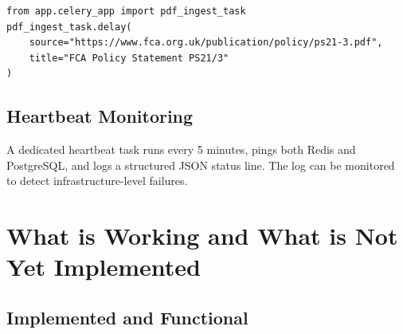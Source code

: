 \documentclass[12pt,a4paper]{article}
\begin{document}
\begin{lstlisting}[caption={Trigger a manual PDF extraction}]
from app.celery_app import pdf_ingest_task
pdf_ingest_task.delay(
    source="https://www.fca.org.uk/publication/policy/ps21-3.pdf",
    title="FCA Policy Statement PS21/3"
)
\end{lstlisting}

\subsection{Heartbeat Monitoring}

A dedicated heartbeat task runs every 5 minutes, pings both Redis and PostgreSQL, and logs a structured JSON status line. The log can be monitored to detect infrastructure-level failures.

\section{What is Working and What is Not Yet Implemented}
\label{sec:roadmap}

\subsection{Implemented and Functional}
\end{document}
